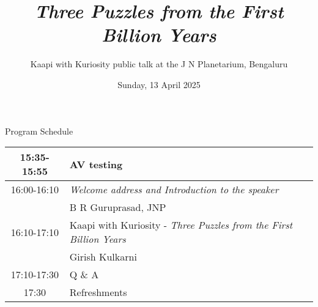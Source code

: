 \documentclass[a4paper,12pt]{article}
\title{\emph{\color{KwKblue}Three Puzzles from the First Billion Years}}
\subtitle{Kaapi with Kuriosity public talk at the J N Planetarium, Bengaluru}
\affiliation{Tata Institute of Fundamental Research, Mumbai} %
\date{Sunday, 13 April 2025}
\begin{document}
\maketitle
\thispagestyle{empty}
\centering
Program Schedule
\begin{table}[h!]
    \begin{center}
    \begin{tabular}{|c|l|} 
        \hline
        15:35-15:55 & AV testing\\\hline
        16:00-16:10 & \emph{Welcome address and Introduction to the speaker}\\ 
            & B R Guruprasad, JNP \\\hline
        16:10-17:10 &Kaapi with Kuriosity - \emph{Three Puzzles from the First Billion Years}\\
        & Girish Kulkarni\\\hline
        17:10-17:30 & Q \& A\\\hline
        17:30 & Refreshments\\\hline
       \end{tabular}
    \end{center}
\end{table}
\end{document}
